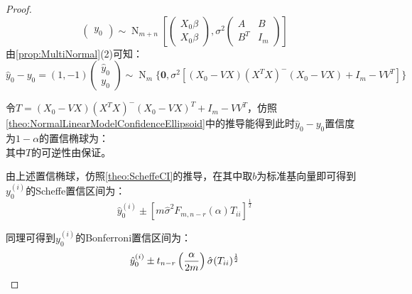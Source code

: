 \begin{proof}
\begin{equation*}
\begin{pmatrix}
			y_0
		\end{pmatrix}\sim\operatorname{N}_{m+n}\left[
		\begin{pmatrix}
			X_0\beta \\
			X_0\beta
		\end{pmatrix},\sigma^2
		\begin{pmatrix}
			A & B \\
			B^T & I_m
		\end{pmatrix}
		\right]
	\end{equation*}
	由\cref{prop:MultiNormal}(2)可知：
	\begin{equation*}
		\hat{y}_0-y_0=
		(1,-1)
		\begin{pmatrix}
			\hat{y}_0 \\
			y_0
		\end{pmatrix}\sim\operatorname{N}_m\{
		\mathbf{0},\sigma^2[(X_0-VX)(X^TX)^-(X_0-VX)+I_m-VV^T]\}
	\end{equation*}\par
	令$T=(X_0-VX)(X^TX)^-(X_0-VX)^T+I_m-VV^T$，仿照\cref{theo:NormalLinearModelConfidenceEllipsoid}中的推导能得到此时$\hat{y}_0-y_0$置信度为$1-\alpha$的置信椭球为：
	\begin{equation*}
		[\hat{y}_0-y_0:(\hat{y}_0-y_0)^T(T)^{-1}(\hat{y}_0-y_0)\leqslant m\hat{\sigma}^2F_{m,n-r}(\alpha)]
	\end{equation*}
	其中$T$的可逆性由保证。\par
	由上述置信椭球，仿照\cref{theo:ScheffeCI}的推导，在其中取$b$为标准基向量即可得到$y_0^{(i)}$的Scheffe置信区间为：
	\begin{equation*}
		\hat{y}_0^{(i)}\pm[m\hat{\sigma}^2F_{m,n-r}(\alpha)T_{ii}]^{\frac{1}{2}}
	\end{equation*}\par
	同理可得到$y_0^{(i)}$的Bonferroni置信区间为：
	\begin{equation*}
		\hat{y}_0^{(i)}\pm t_{n-r}\left(\frac{\alpha}{2m}\right)\hat{\sigma}(T_{ii})^{\frac{1}{2}}\qedhere
	\end{equation*}
\end{proof}





